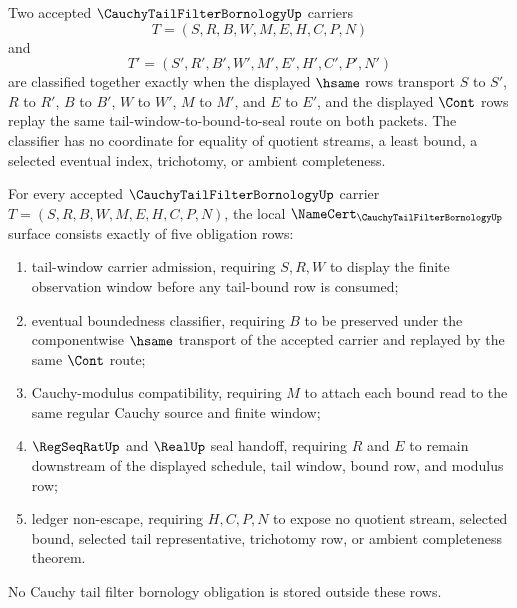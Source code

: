 \begin{definition}\label{def:cauchy-tail-filter-bornology-classifier}
Two accepted $\CauchyTailFilterBornologyUp$ carriers
$$
T=(S,R,B,W,M,E,H,C,P,N)
$$
and
$$
T'=(S',R',B',W',M',E',H',C',P',N')
$$
are classified together exactly when the displayed $\hsame$ rows transport $S$ to $S'$, $R$ to $R'$, $B$ to $B'$, $W$ to $W'$, $M$ to $M'$, and $E$ to $E'$, and the displayed $\Cont$ rows replay the same tail-window-to-bound-to-seal route on both packets. The classifier has no coordinate for equality of quotient streams, a least bound, a selected eventual index, trichotomy, or ambient completeness.
\end{definition}

\begin{theorem}\label{thm:cauchy-tail-filter-bornology-namecert-obligations}
For every accepted $\CauchyTailFilterBornologyUp$ carrier $T=(S,R,B,W,M,E,H,C,P,N)$, the local $\NameCert_{\CauchyTailFilterBornologyUp}$ surface consists exactly of five obligation rows:
\begin{enumerate}
\item tail-window carrier admission, requiring $S,R,W$ to display the finite observation window before any tail-bound row is consumed;
\item eventual boundedness classifier, requiring $B$ to be preserved under the componentwise $\hsame$ transport of the accepted carrier and replayed by the same $\Cont$ route;
\item Cauchy-modulus compatibility, requiring $M$ to attach each bound read to the same regular Cauchy source and finite window;
\item $\RegSeqRatUp$ and $\RealUp$ seal handoff, requiring $R$ and $E$ to remain downstream of the displayed schedule, tail window, bound row, and modulus row;
\item ledger non-escape, requiring $H,C,P,N$ to expose no quotient stream, selected bound, selected tail representative, trichotomy row, or ambient completeness theorem.
\end{enumerate}
No Cauchy tail filter bornology obligation is stored outside these rows.
\end{theorem}
